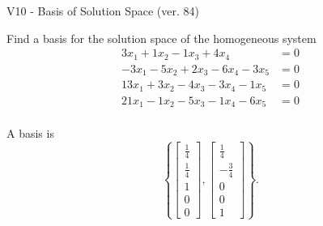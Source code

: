 \begin{exercise}
  \begin{exerciseTitle}V10 - Basis of Solution Space (ver. 84)\end{exerciseTitle}
  \begin{exerciseStatement}
    Find a basis for the solution space of the homogeneous system 
\begin{align*}
 3 x_ 1 + 1 x_ 2 -1 x_ 3 + 4 x_ 4 &= 0  \\ 
  -3 x_ 1 -5 x_ 2 + 2 x_ 3 -6 x_ 4 -3 x_ 5 &= 0  \\ 
  13 x_ 1 + 3 x_ 2 -4 x_ 3 -3 x_ 4 -1 x_ 5 &= 0  \\ 
  21 x_ 1 -1 x_ 2 -5 x_ 3 -1 x_ 4 -6 x_ 5 &= 0  \\ 
 \end{align*}


 
  \end{exerciseStatement}

  \begin{exerciseAnswer}
   A basis is   
\[\left\{\left[\begin{array}{c}
\frac{1}{4} \\
\frac{1}{4} \\
1 \\
0 \\
0
\end{array}\right] , \left[\begin{array}{c}
\frac{1}{4} \\
-\frac{3}{4} \\
0 \\
0 \\
1
\end{array}\right]\right\}.\]

  


  \end{exerciseAnswer}
\end{exercise}